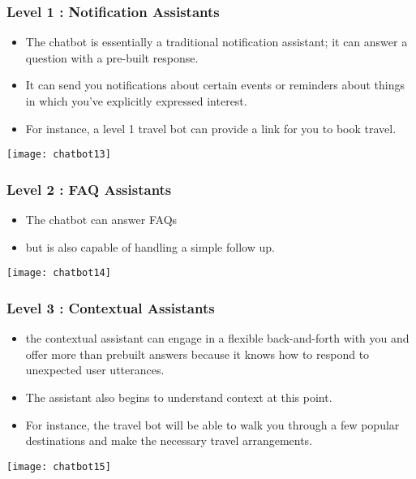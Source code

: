 \begin{frame}[fragile]\frametitle{Level 1 : Notification Assistants}
\begin{itemize}
\item The chatbot is essentially a traditional notification assistant; it can answer a question with a pre-built response. 
\item It can send you notifications about certain events or reminders about things in which you’ve explicitly expressed interest. 
\item For instance, a level 1 travel bot can provide a link for you to book travel.
\end{itemize}

\begin{center}
\texttt{[image: chatbot13]}
\end{center}

\end{frame}

\begin{frame}[fragile]\frametitle{Level 2 : FAQ Assistants}
\begin{itemize}
\item The chatbot can answer FAQs 
\item but is also capable of handling a simple follow up.
\end{itemize}

\begin{center}
\texttt{[image: chatbot14]}
\end{center}

\end{frame}

\begin{frame}[fragile]\frametitle{Level 3 : Contextual Assistants}
\begin{itemize}
\item the contextual assistant can engage in a flexible back-and-forth with you and offer more than prebuilt answers because it knows how to respond to unexpected user utterances. 
\item The assistant also begins to understand context at this point. 
\item For instance, the travel bot will be able to walk you through a few popular destinations and make the necessary travel arrangements.
\end{itemize}

\begin{center}
\texttt{[image: chatbot15]}
\end{center}


\end{frame}


